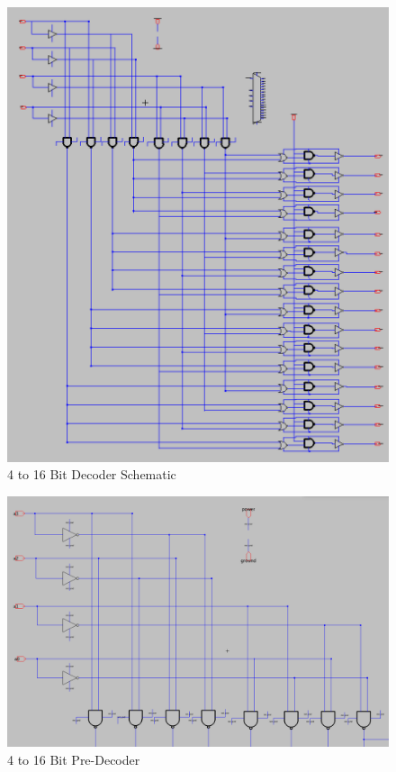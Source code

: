 \documentclass[a4paper]{article}
\begin{document}
\begin{figure}[H]
	\centering
	\includegraphics[scale=0.35]{decoderSchematic}
	\caption{4 to 16 Bit Decoder Schematic}
	\label{fig:decoderSchematic}
\end{figure}

\begin{figure}[H]
	\centering
	\includegraphics[scale=0.25]{decoderSchematicPreDecoder}
	\caption{4 to 16 Bit Pre-Decoder}
	\label{fig:decoderSchematicPreDecoder}
\end{figure}
\end{document}
